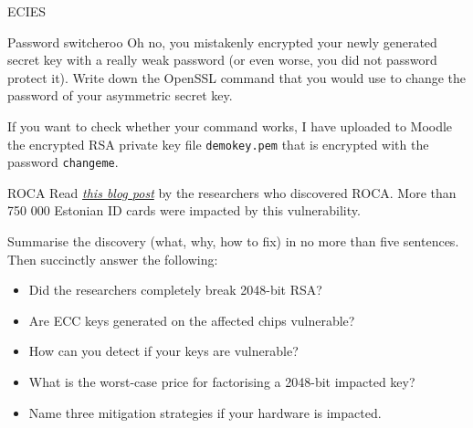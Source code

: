 \documentclass{homework}
\begin{document}
\begin{task}{ECIES}
  \iffalse
  Standards and implementations limit the allowed values for each of these parameters, which helps against misuse (e.g. picking weak options) but complicates interoperability.
  For example, no implementation can comply with all ECIES-defining standards.
  Furthermore, not all options and/or combinations provide equivalent security.
  Picking `strong' parameters while maintaining interoperability is therefore quite tricky. 

  For this task, find three standards where ECIES is defined.
  Then, highlight (preferably in a table) which parameters/algorithms are supported by all three standards (if any).
  \fi
\end{task}

\begin{task}{Password switcheroo}
  Oh no, you mistakenly encrypted your newly generated secret key with a really weak password (or even worse, you did not password protect it).
  Write down the OpenSSL command that you would use to change the password of your asymmetric secret key.

  If you want to check whether your command works, I have uploaded to Moodle the encrypted RSA private key file \texttt{demokey.pem} that is encrypted with the password \texttt{changeme}.
\end{task}

\begin{task}{ROCA}
  Read \href{https://crocs.fi.muni.cz/public/papers/rsa_ccs17}{\emph{this blog post}} by the researchers who discovered ROCA.
  More than 750 000 Estonian ID cards were impacted by this vulnerability.

  Summarise the discovery (what, why, how to fix) in no more than five sentences.
  Then succinctly answer the following:
  \begin{itemize}
    \item Did the researchers completely break 2048-bit RSA?
    \item Are ECC keys generated on the affected chips vulnerable?
    \item How can you detect if your keys are vulnerable?
    \item What is the worst-case price for factorising a 2048-bit impacted key?
    \item Name three mitigation strategies if your hardware is impacted.
  \end{itemize}
\end{task}
\end{document}

